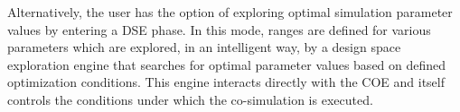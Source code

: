 Alternatively, the user has the option of exploring optimal simulation parameter values by entering a DSE phase.
%
In this mode, ranges are defined for various parameters which are explored, in an intelligent way, by a design space exploration engine that searches for optimal parameter values based on defined optimization conditions.
%
This engine interacts directly with the COE and itself controls the conditions under which the co-simulation is executed.

